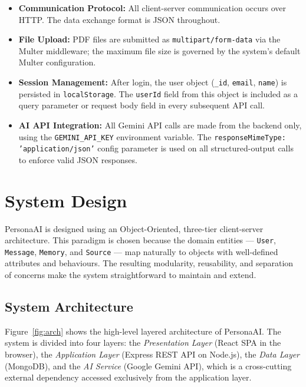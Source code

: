 \documentclass[12pt,a4paper]{report}
\begin{document}
\begin{itemize}
  \item \textbf{Communication Protocol:} All client-server communication occurs over HTTP. The data exchange format is JSON throughout.
  \item \textbf{File Upload:} PDF files are submitted as \texttt{multipart/form-data} via the Multer middleware; the maximum file size is governed by the system's default Multer configuration.
  \item \textbf{Session Management:} After login, the user object (\texttt{\_id}, \texttt{email}, \texttt{name}) is persisted in \texttt{localStorage}. The \texttt{userId} field from this object is included as a query parameter or request body field in every subsequent API call.
  \item \textbf{AI API Integration:} All Gemini API calls are made from the backend only, using the \texttt{GEMINI\_API\_KEY} environment variable. The \texttt{responseMimeType: 'application/json'} config parameter is used on all structured-output calls to enforce valid JSON responses.
\end{itemize}

\chapter{System Design}
\label{chap:design}

PersonaAI is designed using an Object-Oriented, three-tier client-server architecture. This paradigm is chosen because the domain entities — \texttt{User}, \texttt{Message}, \texttt{Memory}, and \texttt{Source} — map naturally to objects with well-defined attributes and behaviours. The resulting modularity, reusability, and separation of concerns make the system straightforward to maintain and extend.

\section{System Architecture}

Figure~\ref{fig:arch} shows the high-level layered architecture of PersonaAI. The system is divided into four layers: the \textit{Presentation Layer} (React SPA in the browser), the \textit{Application Layer} (Express REST API on Node.js), the \textit{Data Layer} (MongoDB), and the \textit{AI Service} (Google Gemini API), which is a cross-cutting external dependency accessed exclusively from the application layer.
\end{document}

